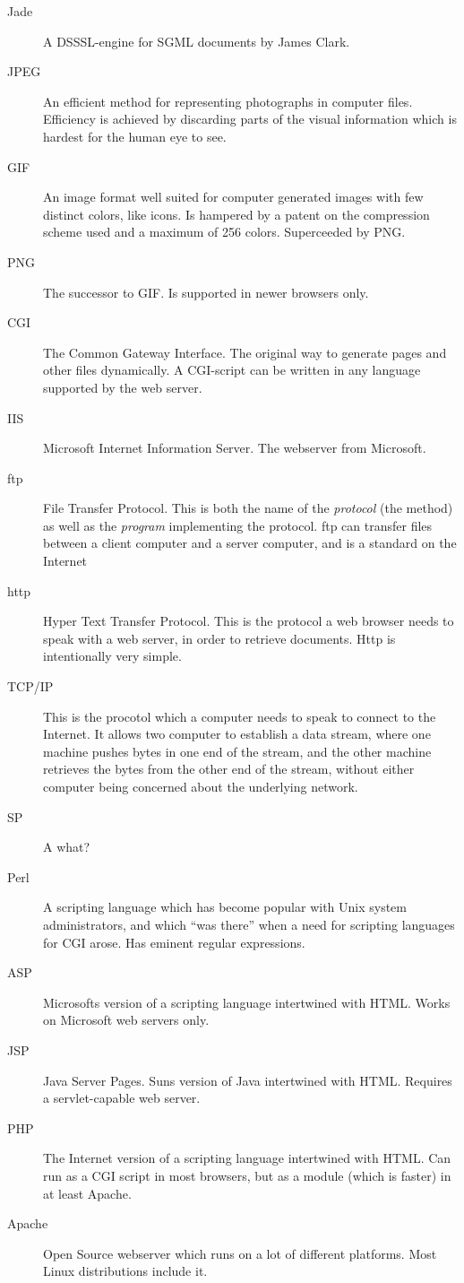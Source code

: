 \begin{description}
\item[Jade] A DSSSL-engine for SGML documents by James Clark.

\item[JPEG] An efficient method for representing photographs in
  computer files.  Efficiency is achieved by discarding parts of the
  visual information which is hardest for the human eye to see.
\item[GIF] An image format well suited for computer generated images
  with few distinct colors, like icons.  Is hampered by a patent on
  the compression scheme used and a maximum of 256 colors.
  Superceeded by PNG.
\item[PNG] The successor to GIF.  Is supported in newer browsers
  only.  
\item[CGI] The Common Gateway Interface.  The original way to generate
  pages and other files dynamically.  A CGI-script can be written in
  any language supported by the web server.

\item[IIS] Microsoft Internet Information Server.  The webserver from
  Microsoft. 
  
\item[ftp] File Transfer Protocol.  This is both the name of the
  \textit{protocol} (the method) as well as the \textit{program}
  implementing the protocol.  ftp can transfer files between a client
  computer and a server computer, and is a standard on the Internet
  
\item[http] Hyper Text Transfer Protocol.  This is the protocol a web
  browser needs to speak with a web server, in order to retrieve
  documents.  Http is intentionally very simple.
\item[TCP/IP] This is the procotol which a computer needs to speak to
  connect to the Internet.  It allows two computer to establish a data
  stream, where one machine pushes bytes in one end of the stream, and
  the other machine retrieves the bytes from the other end of the
  stream, without either computer being concerned about the underlying
  network. 
\item[SP] A \textsf{what}?
\item[Perl] A scripting language which has become popular with Unix
  system administrators, and which ``was there'' when a need for
  scripting languages for CGI arose.  Has eminent regular expressions.
\item[ASP] Microsofts version of a scripting language intertwined with
  HTML. Works on Microsoft web servers only.
\item[JSP] Java Server Pages.  Suns version of Java intertwined with
  HTML.  Requires a servlet-capable web server.
\item[PHP] The Internet version of a scripting language intertwined
  with HTML.  Can run as a CGI script in most browsers, but as a
  module (which is faster) in at least Apache.
\item[Apache] Open Source webserver which runs on a lot of different
  platforms.  Most Linux distributions include it.


\end{description}
